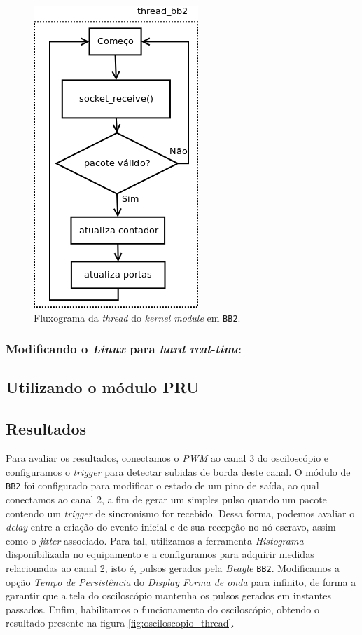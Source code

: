\begin{figure}[h]

\centering
\includegraphics[scale=0.55]{image/thread_bb2}
\caption {Fluxograma da \textit{thread} do \textit{kernel module} em
\texttt{BB2}.}
\label{fig:thread_bb2}
\end{figure}

\FloatBarrier

\subsubsection{Modificando o \textit{Linux} para \textit{hard real-time}}

\subsection{Utilizando o módulo PRU}

\subsection {Resultados}

Para avaliar os resultados, conectamos o \textit{PWM} ao canal 3 do osciloscópio
e configuramos o \textit{trigger} para detectar subidas de borda deste canal. O
módulo de \texttt{BB2} foi configurado para modificar o estado de um pino de
saída, ao qual conectamos ao canal 2, a fim de gerar um simples pulso quando um
pacote contendo um \textit{trigger} de sincronismo for recebido. Dessa forma,
podemos avaliar o \textit{delay} entre a criação do evento inicial e de sua
recepção no nó escravo, assim como o \textit{jitter} associado. Para tal,
utilizamos a ferramenta \textit{Histograma} disponibilizada no equipamento e a
configuramos para adquirir medidas relacionadas ao canal 2, isto é, pulsos
gerados pela \textit{Beagle} \texttt{BB2}. Modificamos a opção \textit{Tempo de
Persistência} do \textit{Display Forma de onda} para infinito, de forma a
garantir que a tela do osciloscópio mantenha os pulsos gerados em instantes
passados. Enfim, habilitamos o funcionamento do osciloscópio, obtendo o
resultado presente na figura \ref{fig:osciloscopio_thread}.

